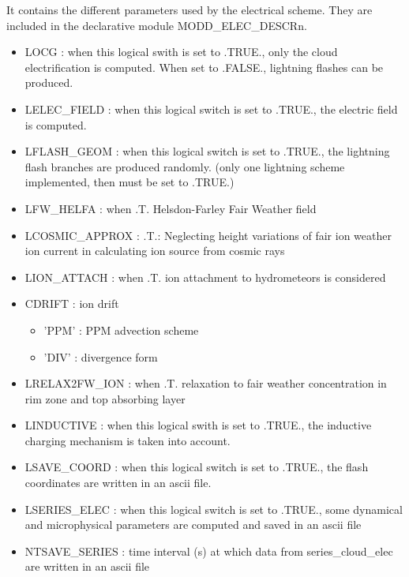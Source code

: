It contains the different parameters used by the electrical scheme. 
They are included in the declarative module MODD\_ELEC\_DESCRn.

\begin{itemize}
  \item LOCG : when this logical swith is set to .TRUE., only the cloud electrification is computed. When set to .FALSE., lightning flashes can be produced.
  \item LELEC\_FIELD  : when this logical switch is set to .TRUE., the electric field is computed.
  \item LFLASH\_GEOM : when this logical switch is set to .TRUE., the lightning flash branches are produced randomly. (only one lightning scheme implemented, then must be set to .TRUE.)
  \item LFW\_HELFA : when .T. Helsdon-Farley Fair Weather field
  \item LCOSMIC\_APPROX  : .T.: Neglecting height variations of fair ion weather ion current in calculating ion source from cosmic rays
  \item LION\_ATTACH : when .T. ion attachment to hydrometeors is considered
  \item CDRIFT : ion drift
    \begin{itemize}
     \item 'PPM' : PPM advection scheme
     \item 'DIV' : divergence form
    \end{itemize}
  \item LRELAX2FW\_ION : when .T. relaxation to fair weather concentration in rim zone and top absorbing layer
  \item LINDUCTIVE : when this logical swith is set to .TRUE., the inductive charging mechanism is taken into account.
  \item LSAVE\_COORD : when this logical switch is set to .TRUE., the flash coordinates are written in an ascii file.
  \item LSERIES\_ELEC : when this logical switch is set to .TRUE., some dynamical and microphysical parameters are computed and saved in an ascii file
  \item NTSAVE\_SERIES : time interval (s) at which data from series\_cloud\_elec are written in an ascii file

\end{itemize}
